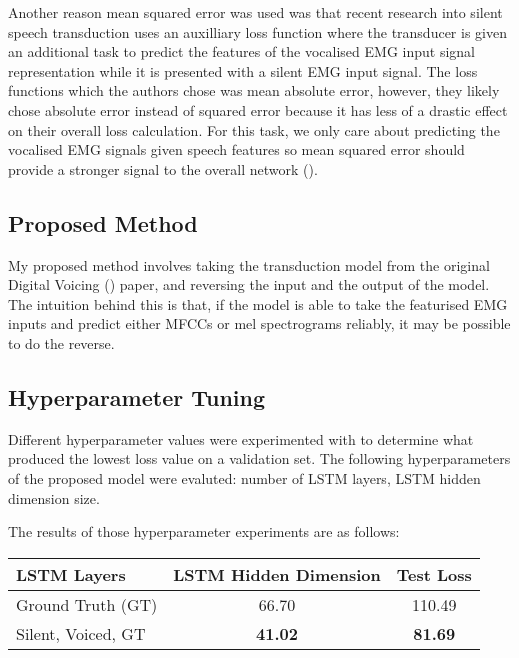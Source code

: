 Another
reason mean squared error was used was that recent research into
silent speech transduction uses an auxilliary loss function where the
transducer is given an additional task to predict the features of
the vocalised EMG input signal representation while it is presented
with a silent EMG input signal. The loss functions which the authors
chose was mean absolute error, however, they likely chose absolute
error instead of squared error because it has less of a drastic
effect on their overall loss calculation. For this task, we only
care about predicting the vocalised EMG signals given speech features
so mean squared error should provide a stronger signal to the overall
network (\cite{silent_speech_tonal}).

\subsection{Proposed Method}

My proposed method involves taking the transduction model from
the original Digital Voicing (\cite{gaddy2020digital}) paper,
and reversing the input and the output of the model. The intuition
behind this is that, if the model is able to take the featurised
EMG inputs and predict either MFCCs or mel spectrograms reliably,
it may be possible to do the reverse.

\subsection{Hyperparameter Tuning}

Different hyperparameter values were experimented with to determine what
produced the lowest loss value on a validation set. The following
hyperparameters of the proposed model were evaluted:
number of LSTM layers, LSTM hidden dimension size.

The results of those hyperparameter experiments are as follows:

{\small\begin{center}
    \begin{tabular} {  l  c | c  }
    \hline
    \textbf{LSTM Layers} & \textbf{LSTM Hidden Dimension} & \textbf{Test Loss} \\
    \hline
    Ground Truth (GT) & 66.70 & 110.49 \\
    Silent, Voiced, GT & \textbf{41.02} & \textbf{81.69} \\
    \hline
    \end{tabular}
\end{center}}

